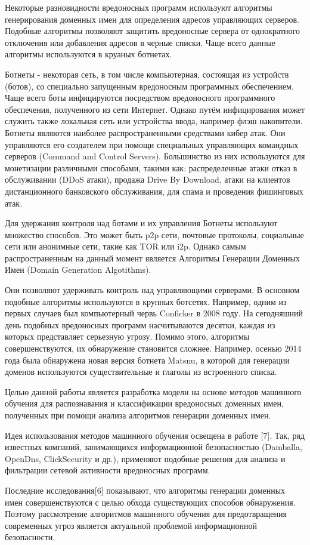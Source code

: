 
Некоторые разновидности вредоносных программ используют алгоритмы генерирования доменных имен для определения адресов управляющих серверов. Подобные алгоритмы позволяют защитить вредоносные сервера от однократного отключения или добавления адресов в черные списки. Чаще всего данные алгоритмы используются в круаных ботнетах.

Ботнеты - некоторая сеть, в том числе компьютерная, состоящая из устройств (ботов), со специально запущенным вредоносным программных обеспечением. Чаще всего боты инфицируются посредством вредоносного программного обеспечения, полученного из сети Интернет. Однако путём инфицирования может служить также локальная сеть или устройства ввода, например флэш накопители. Ботнеты являются наиболее распространенными средствами кибер атак. Они управляются его создателем при помощи специальных управляющих командных серверов (Command and Control Servers). Большинство из них используются для монетизации различными способами, такими как: распределенные атаки отказ в обслуживании (DDoS атаки), продажа Drive By Download, атаки на клиентов дистанционного банковского обслуживания, для спама и проведения фишинговых атак.

Для удержания контроля над ботами и их управления Ботнеты используют множество способов. Это может быть p2p сети, почтовые протоколы, социальные сети или анонимные сети, такие как TOR или i2p.
Однако самым распространенным на данный момент является Алгоритмы Генерации Доменных Имен (Domain Generation Algotithms).

Они позволяют удерживать контроль над управляющими серверами. В основном подобные алгоритмы используются в крупных ботсетях. Например, одним из первых случаев был компьютерный червь Conficker в 2008 году. На сегодняшний день подобных вредоносных программ насчитываются десятки, каждая из которых представляет серьезную угрозу. Помимо этого, алгоритмы совершенствуются, их обнаружение становится сложнее. Например, осенью 2014 года была обнаружена новая версия ботнета Matsnu, в которой для генерации доменов используются существительные и глаголы из встроенного списка.

Целью данной работы является разработка модели на основе методов машинного обучения для распознавания и классификации вредоносных доменных имен, полученных при помощи анализа алгоритмов генерации доменных имен.

Идея использования методов машинного обучения освещена в работе [7]. Так, ряд известных компаний, занимающихся информационной безопасностью (Damballa, OpenDns, ClickSecurity и др.), применяют подобные решения для анализа и фильтрации сетевой активности вредоносных программ.

Последние исследования[6] показывают, что алгоритмы генерации доменных имен совершенствуются с целью обхода существующих способов обнаружения. Поэтому рассмотрение алгоритмов машинного обучения для предотвращения современных угроз является актуальной проблемой информационной безопасности.

\clearpage